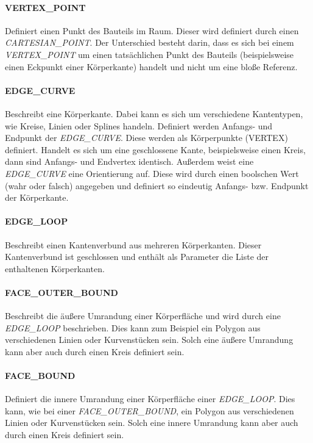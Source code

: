 \paragraph{VERTEX\_POINT}

Definiert einen Punkt des Bauteils im Raum. Dieser wird definiert durch einen \textit{CARTESIAN\_POINT}. Der Unterschied besteht darin, dass es sich bei einem \textit{VERTEX\_POINT} um einen tatsächlichen Punkt des Bauteils (beispielsweise einen Eckpunkt einer Körperkante) handelt und nicht um eine bloße Referenz.   

\paragraph{EDGE\_CURVE}

Beschreibt eine Körperkante. Dabei kann es sich um verschiedene Kantentypen, wie Kreise, Linien oder Splines  handeln. Definiert werden Anfangs- und Endpunkt der \textit{EDGE\_CURVE}. Diese werden als Körperpunkte (VERTEX) definiert. Handelt es sich um eine geschlossene Kante, beispielsweise einen Kreis, dann sind Anfangs- und Endvertex identisch. Außerdem weist eine \textit{EDGE\_CURVE} eine Orientierung auf. Diese wird durch einen boolschen Wert (wahr oder falsch) angegeben und definiert so eindeutig Anfangs- bzw. Endpunkt der Körperkante.   

\paragraph{EDGE\_LOOP}

Beschreibt einen Kantenverbund aus mehreren Körperkanten. Dieser Kantenverbund ist geschlossen und enthält als Parameter die Liste der enthaltenen Körperkanten. 

\paragraph{FACE\_OUTER\_BOUND}

Beschreibt die äußere Umrandung einer Körperfläche und wird durch eine \textit{EDGE\_LOOP} beschrieben. Dies kann zum Beispiel ein Polygon aus verschiedenen Linien oder Kurvenstücken sein. Solch eine äußere Umrandung kann aber auch durch einen Kreis definiert sein.

\paragraph{FACE\_BOUND}

Definiert die innere Umrandung einer Körperfläche einer \textit{EDGE\_LOOP}. Dies kann, wie bei einer \textit{FACE\_OUTER\_BOUND}, ein Polygon aus verschiedenen Linien oder Kurvenstücken sein. Solch eine innere Umrandung kann aber auch durch einen Kreis definiert sein.   


